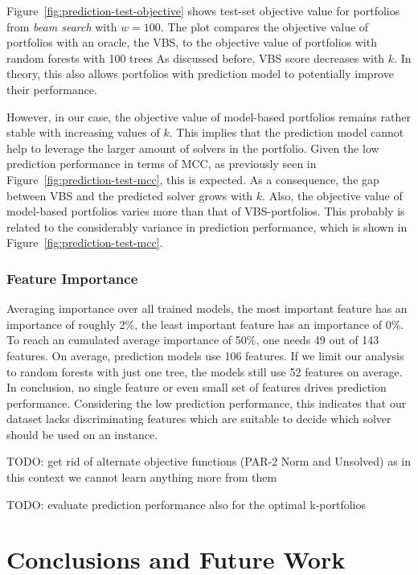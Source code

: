 \documentclass[conference]{IEEEtran}
\newcommand{\todo}[1]{{\color{red}TODO: #1}}
\begin{document}
Figure~\ref{fig:prediction-test-objective} shows test-set objective value for portfolios from \emph{beam search} with $w=100$.
The plot compares the objective value of portfolios with an oracle, the VBS, to the objective value of portfolios with random forests with 100 trees
As discussed before, VBS score decreases with $k$.
In theory, this also allows portfolios with prediction model to potentially improve their performance.

However, in our case, the objective value of model-based portfolios remains rather stable with increasing values of $k$.
This implies that the prediction model cannot help to leverage the larger amount of solvers in the portfolio.
Given the low prediction performance in terms of MCC, as previously seen in Figure~\ref{fig:prediction-test-mcc}, this is expected.
As a consequence, the gap between VBS and the predicted solver grows with $k$.
Also, the objective value of model-based portfolios varies more than that of VBS-portfolios.
This probably is related to the considerably variance in prediction performance, which is shown in Figure~\ref{fig:prediction-test-mcc}.

\subsubsection{Feature Importance}

Averaging importance over all trained models, the most important feature has an importance of roughly 2\%, the least important feature has an importance of 0\%.
To reach an cumulated average importance of 50\%, one needs 49 out of 143 features.
On average, prediction models use 106 features.
If we limit our analysis to random forests with just one tree, the models still use 52 features on average.
In conclusion, no single feature or even small set of features drives prediction performance.
Considering the low prediction performance, this indicates that our dataset lacks discriminating features which are suitable to decide which solver should be used on an instance.

\todo{get rid of alternate objective functions (PAR-2 Norm and Unsolved) as in this context we cannot learn anything more from them}

\todo{evaluate prediction performance also for the optimal k-portfolios}

\section{Conclusions and Future Work}
\label{sec:conclusion}
\end{document}
